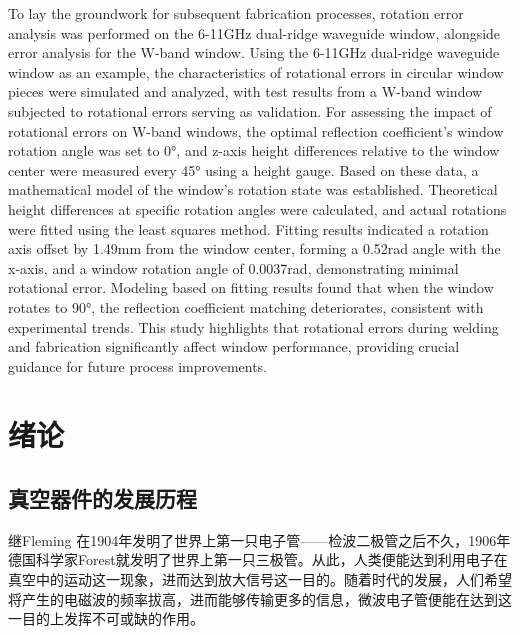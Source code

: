 \documentclass[master]{thesis-uestc}
\begin{document}
\begin{englishabstract}
To lay the groundwork for subsequent fabrication processes, rotation error analysis was performed on the 6-11GHz dual-ridge waveguide window, alongside error analysis for the W-band window. Using the 6-11GHz dual-ridge waveguide window as an example, the characteristics of rotational errors in circular window pieces were simulated and analyzed, with test results from a W-band window subjected to rotational errors serving as validation. For assessing the impact of rotational errors on W-band windows, the optimal reflection coefficient's window rotation angle was set to 0°, and z-axis height differences relative to the window center were measured every 45° using a height gauge. Based on these data, a mathematical model of the window's rotation state was established. Theoretical height differences at specific rotation angles were calculated, and actual rotations were fitted using the least squares method. Fitting results indicated a rotation axis offset by 1.49mm from the window center, forming a 0.52rad angle with the x-axis, and a window rotation angle of 0.0037rad, demonstrating minimal rotational error. Modeling based on fitting results found that when the window rotates to 90°, the reflection coefficient matching deteriorates, consistent with experimental trends. This study highlights that rotational errors during welding and fabrication significantly affect window performance, providing crucial guidance for future process improvements.

\end{englishabstract}

\thesistableofcontents %



\chapter{绪\hspace{6pt}论}
\section{真空器件的发展历程}
继Fleming 在1904年发明了世界上第一只电子管——检波二极管之后不久，1906年德国科学家Forest就发明了世界上第一只三极管。从此，人类便能达到利用电子在真空中的运动这一现象，进而达到放大信号这一目的。随着时代的发展，人们希望将产生的电磁波的频率拔高，进而能够传输更多的信息，微波电子管便能在达到这一目的上发挥不可或缺的作用。
\end{document}
